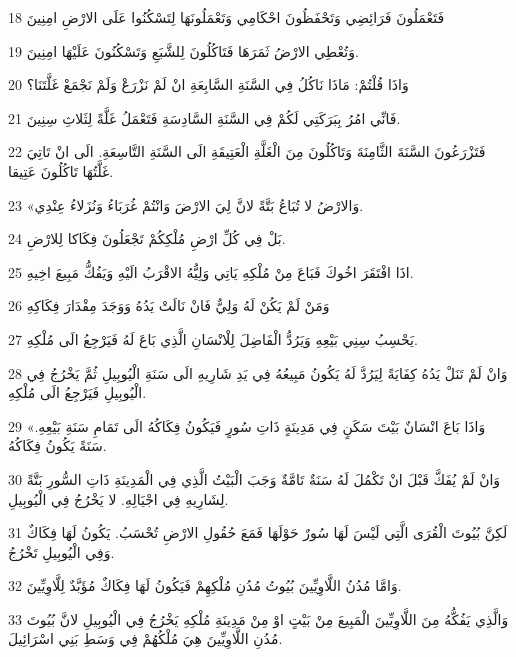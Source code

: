 \par 18 فَتَعْمَلُونَ فَرَائِضِي وَتَحْفَظُونَ احْكَامِي وَتَعْمَلُونَهَا لِتَسْكُنُوا عَلَى الارْضِ امِنِينَ
\par 19 وَتُعْطِي الارْضُ ثَمَرَهَا فَتَاكُلُونَ لِلشَّبَعِ وَتَسْكُنُونَ عَلَيْهَا امِنِينَ.
\par 20 وَاذَا قُلْتُمْ: مَاذَا نَاكُلُ فِي السَّنَةِ السَّابِعَةِ انْ لَمْ نَزْرَعْ وَلَمْ نَجْمَعْ غَلَّتَنَا؟
\par 21 فَانِّي امُرُ بِبَرَكَتِي لَكُمْ فِي السَّنَةِ السَّادِسَةِ فَتَعْمَلُ غَلَّةً لِثَلاثِ سِنِينَ.
\par 22 فَتَزْرَعُونَ السَّنَةَ الثَّامِنَةَ وَتَاكُلُونَ مِنَ الْغَلَّةِ الْعَتِيقَةِ الَى السَّنَةِ التَّاسِعَةِ. الَى انْ تَاتِيَ غَلَّتُهَا تَاكُلُونَ عَتِيقا.
\par 23 «وَالارْضُ لا تُبَاعُ بَتَّةً لانَّ لِيَ الارْضَ وَانْتُمْ غُرَبَاءُ وَنُزَلاءُ عِنْدِي.
\par 24 بَلْ فِي كُلِّ ارْضِ مُلْكِكُمْ تَجْعَلُونَ فِكَاكا لِلارْضِ.
\par 25 اذَا افْتَقَرَ اخُوكَ فَبَاعَ مِنْ مُلْكِهِ يَاتِي وَلِيُّهُ الاقْرَبُ الَيْهِ وَيَفُكُّ مَبِيعَ اخِيهِ.
\par 26 وَمَنْ لَمْ يَكُنْ لَهُ وَلِيٌّ فَانْ نَالَتْ يَدُهُ وَوَجَدَ مِقْدَارَ فِكَاكِهِ
\par 27 يَحْسِبُ سِنِي بَيْعِهِ وَيَرُدُّ الْفَاضِلَ لِلْانْسَانِ الَّذِي بَاعَ لَهُ فَيَرْجِعُ الَى مُلْكِهِ.
\par 28 وَانْ لَمْ تَنَلْ يَدُهُ كِفَايَةً لِيَرُدَّ لَهُ يَكُونُ مَبِيعُهُ فِي يَدِ شَارِيهِ الَى سَنَةِ الْيُوبِيلِ ثُمَّ يَخْرُجُ فِي الْيُوبِيلِ فَيَرْجِعُ الَى مُلْكِهِ.
\par 29 «وَاذَا بَاعَ انْسَانٌ بَيْتَ سَكَنٍ فِي مَدِينَةٍ ذَاتِ سُورٍ فَيَكُونُ فِكَاكُهُ الَى تَمَامِ سَنَةِ بَيْعِهِ. سَنَةً يَكُونُ فِكَاكُهُ.
\par 30 وَانْ لَمْ يُفَكَّ قَبْلَ انْ تَكْمُلَ لَهُ سَنَةٌ تَامَّةٌ وَجَبَ الْبَيْتُ الَّذِي فِي الْمَدِينَةِ ذَاتِ السُّورِ بَتَّةً لِشَارِيهِ فِي اجْيَالِهِ. لا يَخْرُجُ فِي الْيُوبِيلِ.
\par 31 لَكِنَّ بُيُوتَ الْقُرَى الَّتِي لَيْسَ لَهَا سُورٌ حَوْلَهَا فَمَعَ حُقُولِ الارْضِ تُحْسَبُ. يَكُونُ لَهَا فِكَاكٌ وَفِي الْيُوبِيلِ تَخْرُجُ.
\par 32 وَامَّا مُدُنُ اللَّاوِيِّينَ بُيُوتُ مُدُنِ مُلْكِهِمْ فَيَكُونُ لَهَا فِكَاكٌ مُؤَبَّدٌ لِلَّاوِيِّينَ.
\par 33 وَالَّذِي يَفُكُّهُ مِنَ اللَّاوِيِّينَ الْمَبِيعَ مِنْ بَيْتٍ اوْ مِنْ مَدِينَةِ مُلْكِهِ يَخْرُجُ فِي الْيُوبِيلِ لانَّ بُيُوتَ مُدُنِ اللَّاوِيِّينَ هِيَ مُلْكُهُمْ فِي وَسَطِ بَنِي اسْرَائِيلَ.
